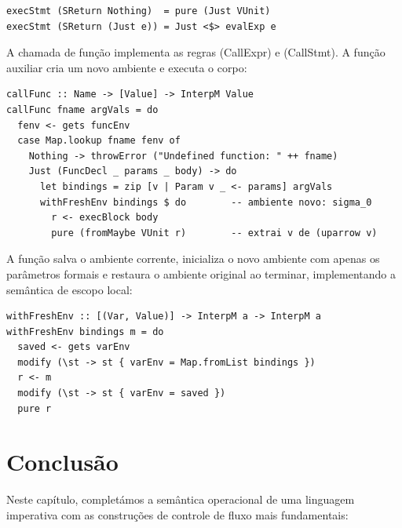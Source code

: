 \begin{verbatim}
execStmt (SReturn Nothing)  = pure (Just VUnit)
execStmt (SReturn (Just e)) = Just <$> evalExp e
\end{verbatim}

A chamada de função implementa as regras (CallExpr) e (CallStmt).
A função auxiliar  cria um novo ambiente e executa
o corpo:

\begin{verbatim}
callFunc :: Name -> [Value] -> InterpM Value
callFunc fname argVals = do
  fenv <- gets funcEnv
  case Map.lookup fname fenv of
    Nothing -> throwError ("Undefined function: " ++ fname)
    Just (FuncDecl _ params _ body) -> do
      let bindings = zip [v | Param v _ <- params] argVals
      withFreshEnv bindings $ do        -- ambiente novo: sigma_0
        r <- execBlock body
        pure (fromMaybe VUnit r)        -- extrai v de (uparrow v)
\end{verbatim}

A função  salva o ambiente corrente, inicializa
o novo ambiente com apenas os parâmetros formais e restaura o ambiente
original ao terminar, implementando a semântica de escopo local:

\begin{verbatim}
withFreshEnv :: [(Var, Value)] -> InterpM a -> InterpM a
withFreshEnv bindings m = do
  saved <- gets varEnv
  modify (\st -> st { varEnv = Map.fromList bindings })
  r <- m
  modify (\st -> st { varEnv = saved })
  pure r
\end{verbatim}

\section{Conclusão}

Neste capítulo, completámos a semântica operacional de uma linguagem
imperativa com as construções de controle de fluxo mais fundamentais:

